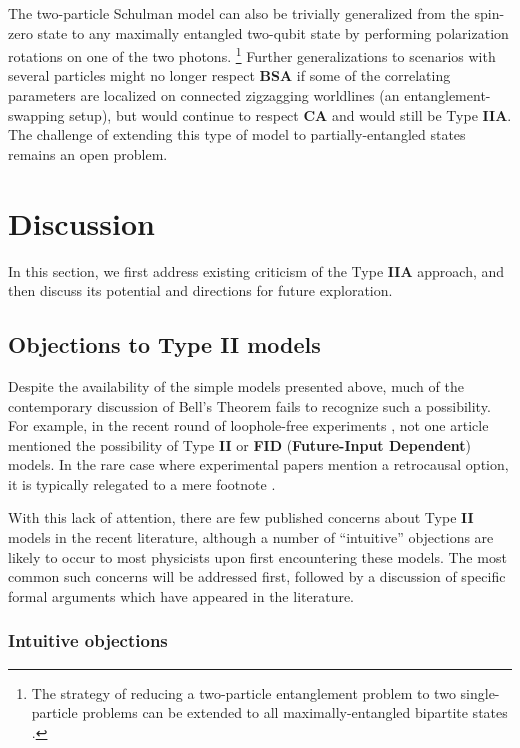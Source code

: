 \documentclass[rmp, aps, preprint, longbibliography]{revtex4-1}
\begin{document}
The two-particle Schulman model can also be trivially generalized from the spin-zero state to any maximally entangled two-qubit state by performing polarization rotations on one of the two photons.%
\footnote{The strategy of reducing a two-particle entanglement problem to two single-particle problems can be extended to all maximally-entangled bipartite states \cite{wharton2011}.}
Further generalizations to scenarios with several particles \cite{bennett1993,pan1998} might no longer respect {\bf BSA} if some of the correlating parameters are localized on connected zigzagging worldlines (an entanglement-swapping setup), but would continue to respect {\bf CA} and would still be Type {\bf IIA}.  The challenge of extending this type of model to partially-entangled states remains an open problem.  


\section{Discussion}
\label{sec:proscons}

In this section, we first address existing criticism of the Type {\bf IIA} approach, and then discuss its potential and directions for future exploration.

\subsection{Objections to Type {\bf II} models}
\label{sec:con_arguments}

Despite the availability of the simple models presented above, much of the contemporary discussion of Bell's Theorem fails to recognize such a possibility.  For example, in the recent round of loophole-free experiments \cite{hensen2015,giustina2015,shalm2015,rosenfeld2017}, not one article mentioned the possibility of Type {\bf II} or {\bf FID} ({\bf Future-Input Dependent}) models.  In the rare case where experimental papers mention a retrocausal option, it is typically relegated to a mere footnote \cite{handsteiner2017,rauch2018}.

With this lack of attention, there are few published concerns about Type {\bf II} models in the recent literature, although a number of ``intuitive'' objections are likely to occur to most physicists upon first encountering these models.  The most common such concerns will be addressed first, followed by a discussion of specific formal arguments which have appeared in the literature.  

\subsubsection{Intuitive objections}
\end{document}
